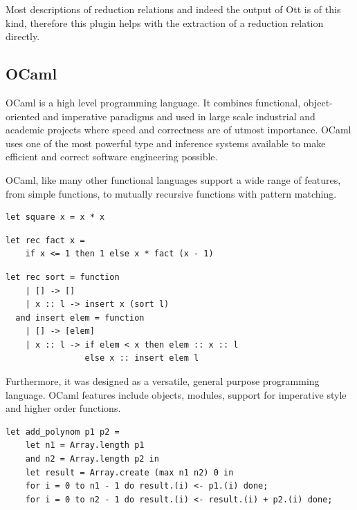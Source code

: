 \documentclass[12pt,twoside,notitlepage]{report}
\begin{document}
Most descriptions of reduction relations and indeed the output of Ott is of this kind, therefore this plugin helps with the extraction of a reduction relation directly. 

\subsection{OCaml}
OCaml is a high level programming language. It combines functional, object-oriented and imperative paradigms and used in large scale industrial and academic projects where speed and correctness are of utmost importance. OCaml uses one of the most powerful type and inference systems available to make efficient and correct software engineering possible.

OCaml, like many other functional languages support a wide range of features, from simple functions, to mutually recursive functions with pattern matching.
\begin{minipage}{\linewidth}
\begin{lstlisting}[caption={OCaml simple function example: square}]
let square x = x * x
\end{lstlisting}
\end{minipage}



\begin{minipage}{\linewidth}
\begin{lstlisting}[caption={OCaml recursive function example: factorial}]
let rec fact x =
    if x <= 1 then 1 else x * fact (x - 1)
\end{lstlisting}
\end{minipage}

\begin{minipage}{\linewidth}
\begin{lstlisting}[caption={OCaml complex function example: insertion sort}]
let rec sort = function
    | [] -> []
    | x :: l -> insert x (sort l)
  and insert elem = function
    | [] -> [elem]
    | x :: l -> if elem < x then elem :: x :: l
                else x :: insert elem l
\end{lstlisting}
\end{minipage}

Furthermore, it was designed as a versatile, general purpose programming language. OCaml features include objects, modules, support for imperative style and higher order functions.

\begin{minipage}{\linewidth}
\begin{lstlisting}[caption={OCaml imperative function example}]
let add_polynom p1 p2 =
    let n1 = Array.length p1
    and n2 = Array.length p2 in
    let result = Array.create (max n1 n2) 0 in
    for i = 0 to n1 - 1 do result.(i) <- p1.(i) done;
    for i = 0 to n2 - 1 do result.(i) <- result.(i) + p2.(i) done;
\end{lstlisting}
\end{minipage}
\end{document}
